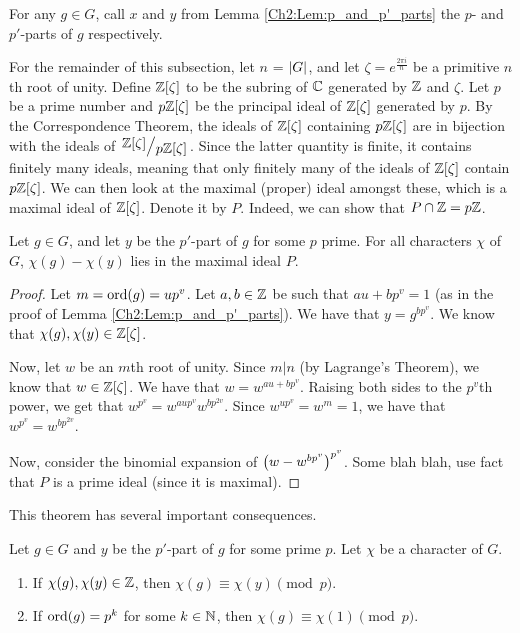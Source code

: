 \begin{boxdefinition}
    For any $g \in G$, call $x$ and $y$ from Lemma \ref{Ch2:Lem:p_and_p'_parts} the $p$- and $p'$-parts of $g$ respectively.
\end{boxdefinition}

For the remainder of this subsection, let $n$ = $\left\lvert G \right\rvert$, and let $\zeta = e^{\frac{2\pi i}{n}}$ be a primitive $n$th root of unity. Define $\mathbb{Z}[\zeta]$ to be the subring of $\mathbb{C}$ generated by $\mathbb{Z}$ and $\zeta$. Let $p$ be a prime number and $p\mathbb{Z}[\zeta]$ be the principal ideal of $\mathbb{Z}[\zeta]$ generated by $p$. By the Correspondence Theorem, the ideals of $\mathbb{Z}[\zeta]$ containing $p\mathbb{Z}[\zeta]$ are in bijection with the ideals of $\quotient{\Z[\zeta]}{p\Z[\zeta]}$. Since the latter quantity is finite, it contains finitely many ideals, meaning that only finitely many of the ideals of $\mathbb{Z}[\zeta]$ contain $p\mathbb{Z}[\zeta]$. We can then look at the maximal (proper) ideal amongst these, which is a maximal ideal of $\mathbb{Z}[\zeta]$. Denote it by $P$. Indeed, we can show that $P \cap \mathbb{Z} = p\mathbb{Z}$.

\begin{theorem}
    Let $g \in G$, and let $y$ be the $p'$-part of $g$ for some $p$ prime. For all characters $\chi$ of $G$, $\chi(g) - \chi(y)$ lies in the maximal ideal $P$.
\end{theorem}
\begin{proof}
    Let $m = \operatorname{ord}\!\left( g \right) = u p^v$. Let $a,b \in \mathbb{Z}$ be such that $au + b p^v = 1$ (as in the proof of Lemma \ref{Ch2:Lem:p_and_p'_parts}). We have that $y = g^{bp^v}$. We know that $\chi(g), \chi(y) \in \mathbb{Z}[\zeta]$.

    Now, let $w$ be an $m$th root of unity. Since $m \vert n$ (by Lagrange's Theorem), we know that $w \in \mathbb{Z}[\zeta]$. We have that $w = w^{au + bp^v}$. Raising both sides to the $p^v$th power, we get that $w^{p^v} = w^{aup^v} w^{bp^{2v}}$. Since $w^{up^v} = w^m = 1$, we have that $w^{p^v} = w^{bp^{2v}}$.

    Now, consider the binomial expansion of $\left( w - w^{bp^v} \right)^{p^v}$. Some blah blah, use fact that $P$ is a prime ideal (since it is maximal). %
\end{proof}

This theorem has several important consequences.

\begin{corollary}
    Let $g \in G$ and $y$ be the $p'$-part of $g$ for some prime $p$. Let $\chi$ be a character of $G$.
    \begin{enumerate}[label = \normalfont \arabic*., noitemsep]
        \item If $\chi(g), \chi(y) \in \mathbb{Z}$, then $\chi(g) \equiv \chi(y) \pmod{p}$.
        \item If $\operatorname{ord}\!\left( g \right) = p^k$ for some $k \in \mathbb{N}$, then $\chi(g) \equiv \chi(1) \pmod{p}$.
    \end{enumerate}
\end{corollary}

